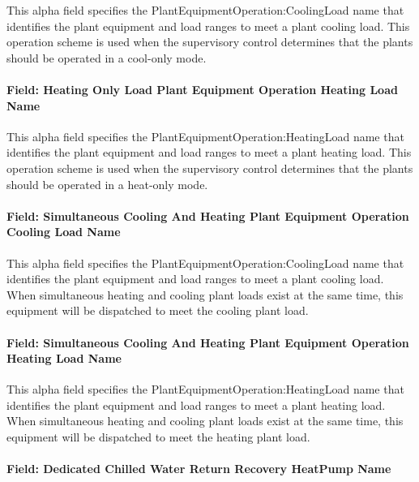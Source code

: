 This alpha field specifies the PlantEquipmentOperation:CoolingLoad name that identifies the plant equipment and load ranges to meet a plant cooling load. This operation scheme is used when the supervisory control determines that the plants should be operated in a cool-only mode. 

\paragraph{Field: Heating Only Load Plant Equipment Operation Heating Load Name}\label{field-heat-only-load-equip-operation-name-plantequipmentoperationchillerheaterchangeover}

This alpha field specifies the PlantEquipmentOperation:HeatingLoad name that identifies the plant equipment and load ranges to meet a plant heating load. This operation scheme is used when the supervisory control determines that the plants should be operated in a heat-only mode. 

\paragraph{Field: Simultaneous Cooling And Heating Plant Equipment Operation Cooling Load Name}\label{field-simulataneous-cooling-and-heating-plant-equip-operation-cooling-name-plantequipmentoperationchillerheaterchangeover}

This alpha field specifies the PlantEquipmentOperation:CoolingLoad name that identifies the plant equipment and load ranges to meet a plant cooling load. When simultaneous heating and cooling plant loads exist at the same time, this equipment will be dispatched to meet the cooling plant load.

\paragraph{Field: Simultaneous Cooling And Heating Plant Equipment Operation Heating Load Name}\label{field-simulataneous-cooling-and-heating-plant-equip-operation-heating-name-plantequipmentoperationchillerheaterchangeover}

This alpha field specifies the PlantEquipmentOperation:HeatingLoad name that identifies the plant equipment and load ranges to meet a plant heating load. When simultaneous heating and cooling plant loads exist at the same time, this equipment will be dispatched to meet the heating plant load.

\paragraph{Field: Dedicated Chilled Water Return Recovery HeatPump Name}\label{field-dedicated-chilled-return-recovery-hp-name-plantequipmentoperationchillerheaterchangeover}

